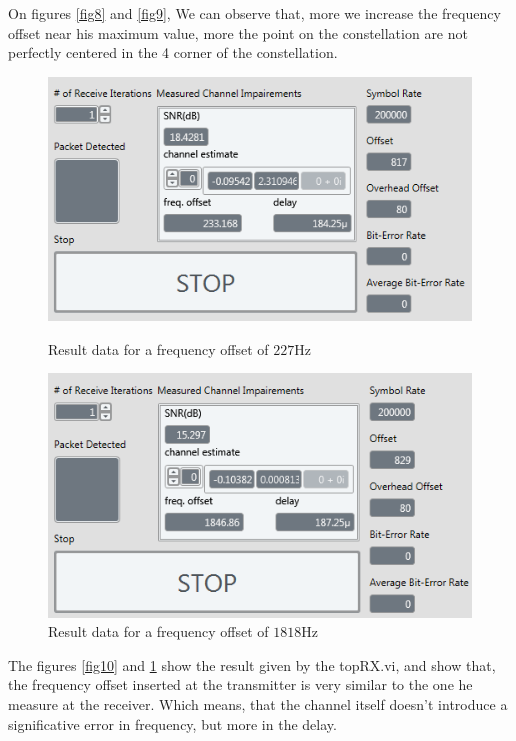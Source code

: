 \documentclass[frenchb, oneside, headings=normal]{scrartcl}
\begin{document}
On figures \ref{fig8} and \ref{fig9}, We can observe that, more we increase the frequency offset near his maximum value, more the point on the constellation are not perfectly centered in the 4 corner of the constellation.

\begin{figure}[!ht]
    \begin{minipage}[b]{0.48\linewidth}
        \centering \includegraphics[scale=0.7]{img/USRP_value_227.PNG}
     \caption{Result data for a frequency offset of $227 \si{\hertz}$}
     \label{fig10}
    \end{minipage}\hfill
    \begin{minipage}[b]{0.48\linewidth}
         \centering \includegraphics[scale=0.7]{img/USRP_value_1818.PNG}
          \caption{Result data for a frequency offset of $1818 \si{\hertz}$}
          \label{fig11}
    \end{minipage}  
\end{figure}

The figures \ref{fig10} and \ref{fig11} show the result given by the topRX.vi, and show that, the frequency offset inserted at the transmitter is very similar to the one he measure at the receiver. Which means, that the channel itself doesn't introduce a significative error in frequency, but more in the delay.
\newpage
\end{document}
